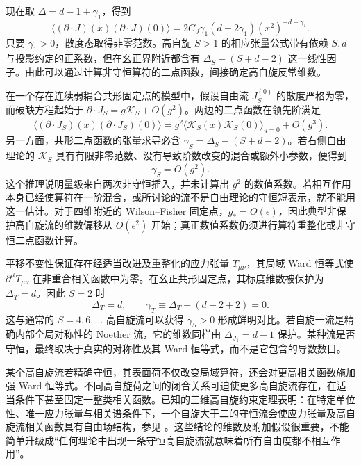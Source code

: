 现在取 $\Delta=d-1+\gamma_1$，得到
\begin{equation}\label{eq:ghs-vector-divergence-gamma}
 \langle(\partial\cdot J)(x)(\partial\cdot J)(0)\rangle
 =2C_J\gamma_1(d+2\gamma_1)
 (x^2)^{-d-\gamma_1}.
\end{equation}
只要 $\gamma_1>0$，散度态取得非零范数。高自旋 $S>1$ 的相应张量公式带有依赖 $S,d$ 与投影约定的正系数，但在幺正界附近都含有 $\Delta_S-(S+d-2)$ 这一线性因子。由此可以通过计算非守恒算符的二点函数，间接确定高自旋反常维数。


在一个存在连续弱耦合共形固定点的模型中，假设自由流 $J_S^{(0)}$ 的散度严格为零，而破缺方程起始于 $\partial\cdot J_S=g\mathcal K_S+O(g^2)$。两边的二点函数在领先阶满足
\begin{equation}\label{eq:ghs-broken-current-norm-scaling}
 \langle(\partial\cdot J_S)(x)(\partial\cdot J_S)(0)\rangle
 =g^2\langle\mathcal K_S(x)\mathcal K_S(0)\rangle_{g=0}
 +O(g^3).
\end{equation}
另一方面，共形二点函数的张量求导必含 $\gamma_S=\Delta_S-(S+d-2)$。若右侧自由理论的 $\mathcal K_S$ 具有有限非零范数、没有导致阶数改变的混合或额外小参数，便得到
\begin{equation}\label{eq:ghs-broken-current-gamma-order}
 \gamma_S=O(g^2).
\end{equation}
这个推理说明量级来自两次非守恒插入，并未计算出 $g^2$ 的数值系数。若相互作用本身已经使算符在一阶混合，或所讨论的流不是自由理论的守恒短表示，就不能用这一估计。对于四维附近的 Wilson--Fisher 固定点，$g_*=O(\epsilon)$，因此典型非保护高自旋流的维数偏移从 $O(\epsilon^2)$ 开始；真正数值系数仍须进行算符重整化或非守恒二点函数计算。


平移不变性保证存在经适当改进及重整化的应力张量 $T_{\mu\nu}$，其局域 Ward 恒等式使 $\partial^\mu T_{\mu\nu}$ 在非重合相关函数中为零。在幺正共形固定点，其标度维数被保护为 $\Delta_T=d$。因此 $S=2$ 时
\begin{equation}\label{eq:ghs-stress-tensor-protection}
 \Delta_T=d,
 \qquad\gamma_T\equiv\Delta_T-(d-2+2)=0.
\end{equation}
这与通常的 $S=4,6,\ldots$ 高自旋流可以获得 $\gamma_S>0$ 形成鲜明对比。若自旋一流是精确内部全局对称性的 Noether 流，它的维数同样由 $\Delta_{J_1}=d-1$ 保护。某种流是否守恒，最终取决于真实的对称性及其 Ward 恒等式，而不是它包含的导数数目。


某个高自旋流若精确守恒，其表面荷不仅改变局域算符，还会对更高相关函数施加强 Ward 恒等式。不同高自旋荷之间的闭合关系可迫使更多高自旋流存在，在适当条件下甚至固定一整类相关函数。已知的三维高自旋约束定理表明：在特定单位性、唯一应力张量与相关谱条件下，一个自旋大于二的守恒流会使应力张量及高自旋流相关函数具有自由场结构，参见 \cite{ghs-maldacena-zh,ghs-alba-diab}。这些结论的维数及附加假设很重要，不能简单升级成“任何理论中出现一条守恒高自旋流就意味着所有自由度都不相互作用”。

